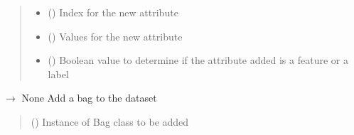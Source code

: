 \documentclass[letterpaper,10pt,english]{sphinxmanual}
\begin{document}
\begin{fulllineitems}
\begin{fulllineitems}
\begin{quote}
\begin{description}
\begin{itemize}
\item {} 
\sphinxAtStartPar
{} (\sphinxstyleliteralemphasis{\sphinxupquote{, }}) \textendash{} Index for the new attribute

\item {} 
\sphinxAtStartPar
{} (\sphinxstyleliteralemphasis{\sphinxupquote{(}}\sphinxstyleliteralemphasis{\sphinxupquote{)}}) \textendash{} Values for the new attribute

\item {} 
\sphinxAtStartPar
{} () \textendash{} Boolean value to determine if the attribute added is a feature or a label

\end{itemize}

\end{description}\end{quote}

\end{fulllineitems}


\begin{fulllineitems}
\label{\detokenize{data/_autosummary/miml.data.miml_dataset.MIMLDataset:miml.data.miml_dataset.MIMLDataset.add_bag}}
\pysigstartsignatures
\pysiglinewithargsret
{}
{}
{{ $\rightarrow$ None}}
\pysigstopsignatures
\sphinxAtStartPar
Add a bag to the dataset
\begin{quote}\begin{description}
\sphinxAtStartPar
{} ({\hyperref[\detokenize{data/_autosummary/miml.data.bag.Bag:miml.data.bag.Bag}]{}}) \textendash{} Instance of Bag class to be added


\end{description}
\end{quote}
\end{fulllineitems}
\end{fulllineitems}
\end{document}
